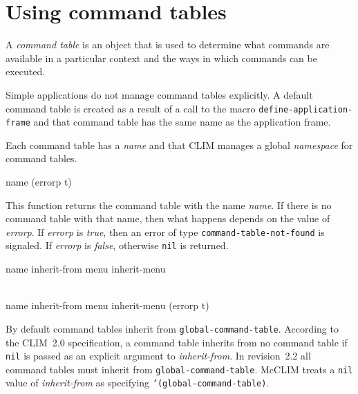 \chapter{Using command tables}

A \emph{command table} is an object that is used to determine what
commands are available in a particular context and the ways in which
commands can be executed.

Simple applications do not manage command tables explicitly.  A
default command table is created as a result of a call to the macro
\texttt{define-application-frame} and that command table has the same
name as the application frame.

Each command table has a \emph{name} and that CLIM manages a global
\emph{namespace} for command tables.

 {name \key (errorp t)}

This function returns the command table with the name \textit{name}.
If there is no command table with that name, then what happens depends
on the value of \textit{errorp}.  If \textit{errorp} is \emph{true},
then an error of type \texttt{command-table-not-found} is signaled. 
If \textit{errorp} is \emph{false}, otherwise \texttt{nil} is
returned.

 {name \key inherit-from menu
  inherit-menu}

 {\\name \key inherit-from menu
  inherit-menu (errorp t)}

By default command tables inherit from
\texttt{global-command-table}. According to the CLIM~2.0
specification, a command table inherits from no command table if
\texttt{nil} is passed as an explicit argument to
\textit{inherit-from}. In revision~2.2 all command tables must inherit
from \texttt{global-command-table}. McCLIM treats a \texttt{nil} value
of \textit{inherit-from} as specifying \texttt{'(global-command-table)}.
